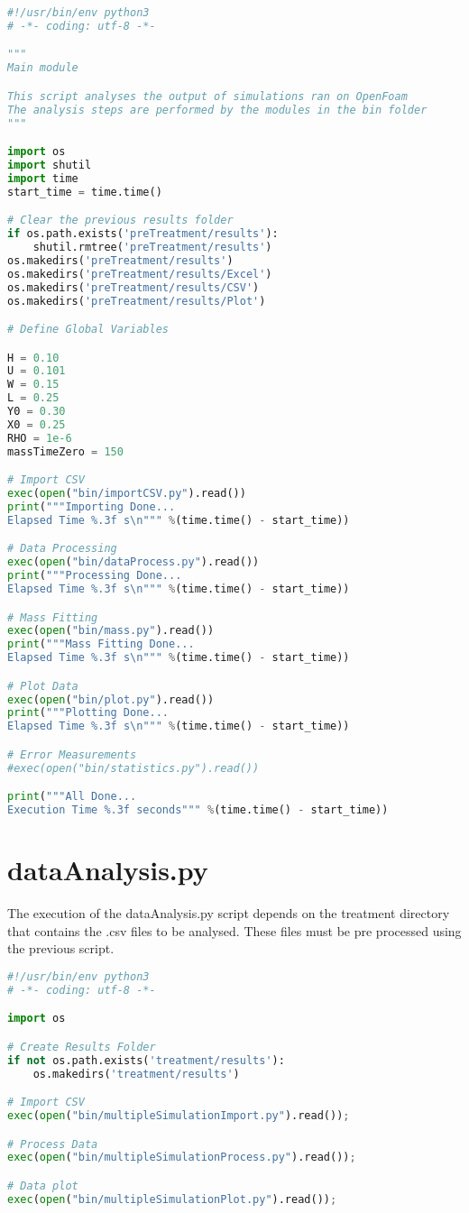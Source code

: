 \begin{lstlisting}[language=python]
#!/usr/bin/env python3
# -*- coding: utf-8 -*-

"""
Main module

This script analyses the output of simulations ran on OpenFoam
The analysis steps are performed by the modules in the bin folder
"""

import os
import shutil
import time
start_time = time.time()

# Clear the previous results folder
if os.path.exists('preTreatment/results'):
    shutil.rmtree('preTreatment/results')
os.makedirs('preTreatment/results')
os.makedirs('preTreatment/results/Excel')
os.makedirs('preTreatment/results/CSV')
os.makedirs('preTreatment/results/Plot')

# Define Global Variables

H = 0.10
U = 0.101
W = 0.15
L = 0.25
Y0 = 0.30
X0 = 0.25
RHO = 1e-6
massTimeZero = 150

# Import CSV
exec(open("bin/importCSV.py").read())
print("""Importing Done...
Elapsed Time %.3f s\n""" %(time.time() - start_time))

# Data Processing
exec(open("bin/dataProcess.py").read())
print("""Processing Done...
Elapsed Time %.3f s\n""" %(time.time() - start_time))

# Mass Fitting
exec(open("bin/mass.py").read())
print("""Mass Fitting Done...
Elapsed Time %.3f s\n""" %(time.time() - start_time))

# Plot Data
exec(open("bin/plot.py").read())
print("""Plotting Done...
Elapsed Time %.3f s\n""" %(time.time() - start_time))

# Error Measurements
#exec(open("bin/statistics.py").read())

print("""All Done...
Execution Time %.3f seconds""" %(time.time() - start_time))

\end{lstlisting}
\section{dataAnalysis.py}
\noindent
The execution of the dataAnalysis.py script depends on the treatment directory that contains the .csv files to be analysed. These files must be pre processed using the previous script.
\begin{lstlisting}[language=python]
#!/usr/bin/env python3
# -*- coding: utf-8 -*-

import os

# Create Results Folder
if not os.path.exists('treatment/results'):
    os.makedirs('treatment/results')

# Import CSV
exec(open("bin/multipleSimulationImport.py").read());

# Process Data
exec(open("bin/multipleSimulationProcess.py").read());

# Data plot
exec(open("bin/multipleSimulationPlot.py").read());
\end{lstlisting}
